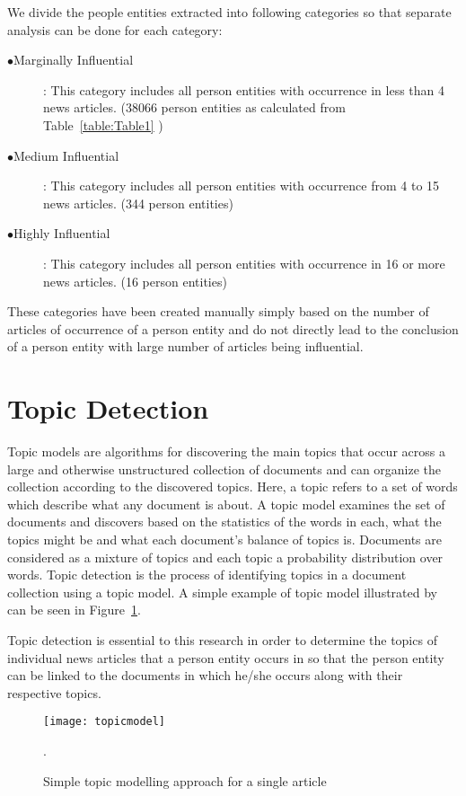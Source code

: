 We divide the people entities extracted into following categories so that separate analysis can be done for each category:
\begin{description}
 \item[$\bullet$Marginally Influential]: This category includes all person entities with occurrence in less than 4 news articles. (38066 person entities as calculated from Table~\ref{table:Table1} )
\item[$\bullet$Medium Influential]: This category includes all person entities with occurrence from 4 to 15 news articles. (344 person entities) 
\item[$\bullet$Highly Influential] : This category includes all person entities with occurrence in 16 or more news articles. (16 person entities)
\end{description}
These categories have been created manually simply based on the number of articles of occurrence of a person entity and do not directly lead to the conclusion of a person entity with large number of articles being influential.  


\section{Topic Detection}
\label{topic detection}

 Topic models are algorithms for discovering the main topics that occur across a large and otherwise 
unstructured collection of documents and can organize the collection according to the discovered topics.
Here, a topic refers to a set of words which describe what any document is about.
 A topic model examines the set of documents and discovers based on the statistics of the words in each, what the topics might be and what each document's balance of topics is.
Documents are considered as a mixture of topics and each topic a probability distribution over words.
 Topic detection is the process of identifying topics in a document collection using a topic model. A simple example of topic model illustrated by \cite{blei2012probabilistic} can be seen in Figure~\ref{figure:example}.

Topic detection is essential to this research in order to determine the topics of individual news articles that a person entity occurs in so that the person entity can be linked to the documents in which he/she occurs along with their respective topics.

\begin{figure}[h]
\begin{center}
\texttt{[image: topicmodel]}
\caption{Simple topic modelling approach for a single article\cite{blei2012probabilistic}}.
\label{figure:example}
\end{center}
\end{figure} 


